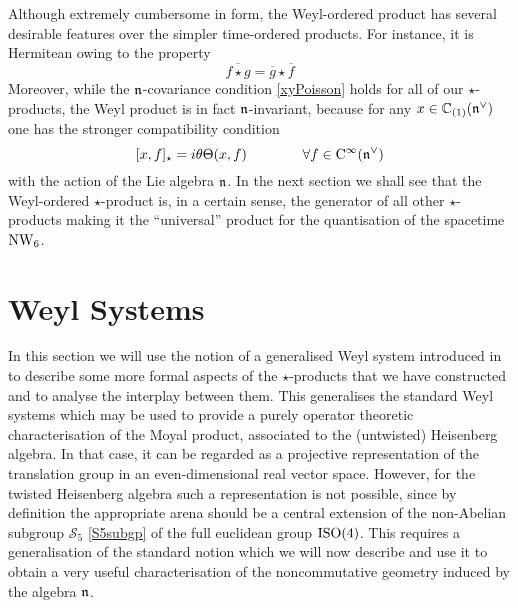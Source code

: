 Although extremely cumbersome in form, the Weyl-ordered product has several
desirable features over the simpler time-ordered products. For instance, it is
Hermitean owing to the property
\begin{equation}
  \label{Weylstarherm}
  \overline{f\star g}=\overline{g}\star\overline{f}
\end{equation}
Moreover, while the ${\mathfrak n}$-covariance condition \eqref{xyPoisson} holds for all
of our $\star$-products, the Weyl product is in fact ${\mathfrak n}$-invariant, because for
any $x\in{\mathbb C}_{(1)}({\mathfrak n}^\vee)$ one has the stronger compatibility condition
\begin{equation}
  \label{strongcompcond}
  [x,f]_\star= i\theta \Theta(x,f)\qquad\qquad\forall f\in{\rm C}^\infty({\mathfrak n}^\vee)
\end{equation}
with the action of the Lie algebra ${\mathfrak n}$. In the next section we shall see that
the Weyl-ordered $\star$-product is, in a certain sense, the generator of all other
$\star$-products making it the ``universal'' product for the quantisation of the
spacetime $\operatorname{NW}_6$.

\section{Weyl Systems}
\label{WeylSystems}

In this section we will use the notion of a generalised Weyl system introduced
in \cite{ALZ1} to describe some more formal aspects of the $\star$-products that
we have constructed and to analyse the interplay between them. This generalises
the standard Weyl systems \cite{Sz1} which may be used to provide a purely
operator theoretic characterisation of the Moyal product, associated to the
(untwisted) Heisenberg algebra. In that case, it can be regarded as a projective
representation of the translation group in an even-dimensional real vector
space. However, for the twisted Heisenberg algebra such a representation is not
possible, since by definition the appropriate arena should be a central
extension of the non-Abelian subgroup $\mathcal S_5$ \eqref{S5subgp} of the full
euclidean group ${\rm ISO}(4)$. This requires a generalisation of the standard
notion which we will now describe and use it to obtain a very useful
characterisation of the noncommutative geometry induced by the algebra ${\mathfrak n}$.

